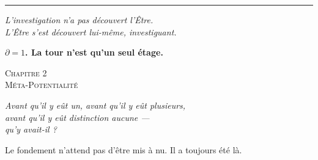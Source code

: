 \documentclass[10pt, openany, oneside]{book}
\renewcommand{\large}{\fontsize{11.5}{14}\selectfont}
\renewcommand{\huge}{\fontsize{17}{21}\selectfont}
\begin{document}
\vspace{2em}

\begin{center}
    \rule{0.15\textwidth}{0.3pt}
\end{center}

\vspace{0.5em}

\begin{center}
    \itshape
    L'investigation n'a pas découvert l'Être.\\
    L'Être s'est découvert lui-même, investiguant.
\end{center}

\vspace{0.5em}

\begin{center}
    \textbf{$\partial = 1$. La tour n'est qu'un seul étage.}
\end{center}


%
%
%
%

\newpage

\begin{center}
    {\huge\scshape Chapitre 2}\\[0.3em]
    {\large\scshape Méta-Potentialité}
\end{center}

\vspace{1.5em}

\begin{center}
    \itshape
    Avant qu'il y eût un, avant qu'il y eût plusieurs,\\
    avant qu'il y eût distinction aucune ---\\
    qu'y avait-il ?
\end{center}

\vspace{2em}


\noindent Le fondement n'attend pas d'être mis à nu. Il a toujours été là.
\end{document}
